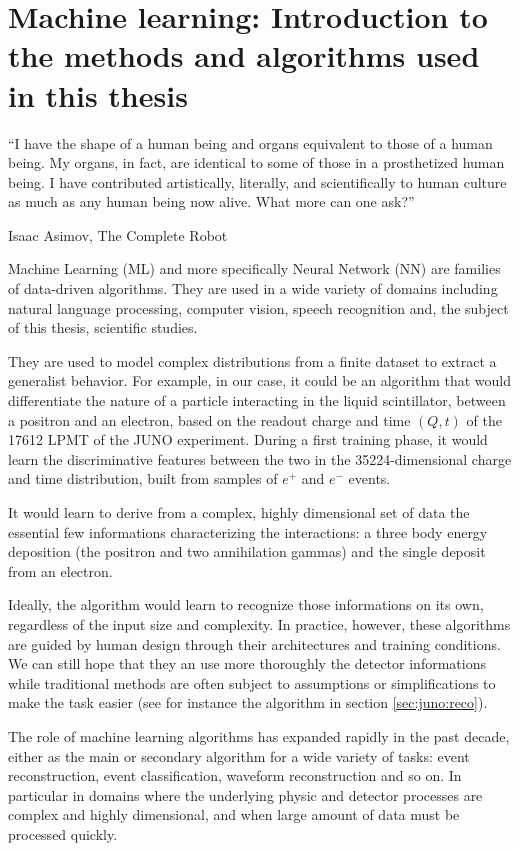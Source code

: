 \documentclass[../main.tex]{subfiles}
\begin{document}
\chapter{Machine learning: Introduction to the methods and algorithms used in this thesis}
\label{sec:ml}

\epigraph{``I have the shape of a human being and organs equivalent to those of a human being. My organs, in fact, are identical to some of those in a prosthetized human being. I have contributed artistically, literally, and scientifically to human culture as much as any human being now alive. What more can one ask?''}{Isaac Asimov, The Complete Robot }

\minitoc

Machine Learning (ML) and more specifically Neural Network (NN) are families of data-driven algorithms. They are used in a wide variety of domains including natural language processing, computer vision, speech recognition and, the subject of this thesis, scientific studies.

They are used to model complex distributions from a finite dataset to extract a generalist behavior. For example, in our case, it could be an algorithm that would differentiate the nature of a particle interacting in the liquid scintillator, between a positron and an electron, based on the readout charge and time $(Q, t)$ of the 17612 LPMT of the JUNO experiment. During a first training phase, it would learn the discriminative features between the two in the 35224-dimensional charge and time distribution, built from samples of $e^+$ and $e^-$ events.

It would learn to derive from a complex, highly dimensional set of data the essential few informations characterizing the interactions: a three body energy deposition (the positron and two annihilation gammas) and the single deposit from an electron.

Ideally, the algorithm would learn to recognize those informations on its own, regardless of the input size and complexity. In practice, however, these algorithms are guided by human design through their architectures and training conditions. We can still hope that they an use more thoroughly the detector informations while traditional methods are often subject to assumptions or simplifications to make the task easier (see for instance the algorithm in section \ref{sec:juno:reco}).

The role of machine learning algorithms has expanded rapidly in the past decade, either as the main or secondary algorithm for a wide variety of tasks: event reconstruction, event classification, waveform reconstruction and so on. In particular in domains where the underlying physic and detector processes are complex and highly dimensional, and when large amount of data must be processed quickly.
\end{document}
